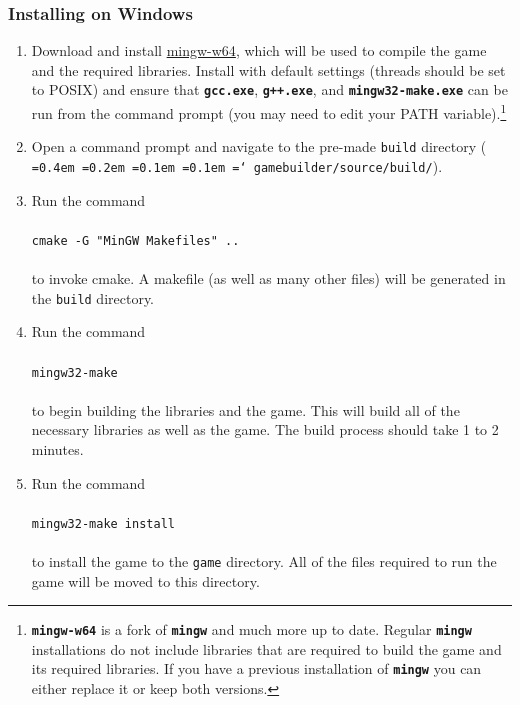 \documentclass[12pt, titlepage]{article}
\newcommand*\justify{%
  \fontdimen2\font=0.4em%
  \fontdimen3\font=0.2em%
  \fontdimen4\font=0.1em%
  \fontdimen7\font=0.1em%
  \hyphenchar\font=`\-%
}
\begin{document}
\subsubsection{Installing on Windows}
\begin{enumerate}
  \item Download and install \href{http://sourceforge.net/projects/mingw-w64/}{mingw-w64}, which will be used to compile the game and the required libraries.  Install with default settings (threads should be set to POSIX) and ensure that \texttt{\bf gcc.exe}, \texttt{\bf g++.exe}, and \texttt{\bf mingw32-make.exe} can be run from the command prompt (you may need to edit your PATH variable).\footnote{\texttt{\bf mingw-w64} is a fork of \texttt{\bf mingw} and much more up to date.  Regular \texttt{\bf mingw} installations do not include libraries that are required to build the game and its required libraries.  If you have a previous installation of \texttt{\bf mingw} you can either replace it or keep both versions.}

  \item Open a command prompt and navigate to the pre-made \texttt{build} directory (\texttt{\justify gamebuilder/source/build/}).
  \item Run the command\\\\
   ${}$\qquad \texttt{cmake -G "MinGW Makefiles" ..}\\\\
    to invoke cmake.  A makefile (as well as many other files) will be generated in the \texttt{build} directory.

  \item Run the command\\\\
   ${}$\qquad \texttt{mingw32-make}\\\\
    to begin building the libraries and the game.  This will build all of the necessary libraries as well as the game.  The build process should take 1 to 2 minutes.

  \item Run the command\\\\
  ${}$\qquad \texttt{mingw32-make install}\\\\
  to install the game to the \texttt{game} directory.  All of the files required to run the game will be moved to this directory.

\end{enumerate}
\end{document}
